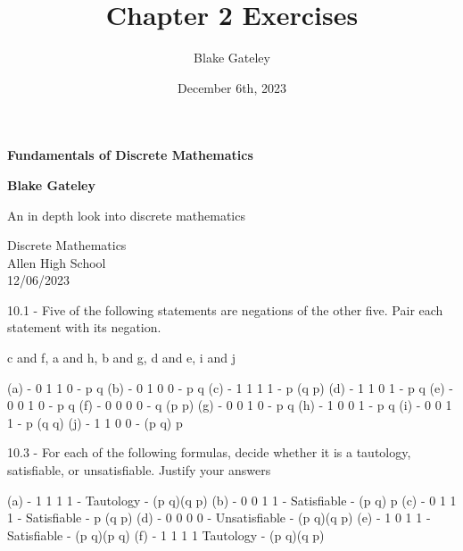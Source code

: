 \documentclass[12pt]{article}
\title{Chapter 2 Exercises}
\author{Blake Gateley}
\date{December 6th, 2023}
\begin{document}
\begin{titlepage}
   \begin{center}
       \vspace*{1cm}

       {\Huge \textbf{Fundamentals of Discrete Mathematics}}

       \vspace{0.5cm}
            
       \vspace{1.5cm}

       \textbf{Blake Gateley}


       
       \vfill
            
       An in depth look into discrete mathematics
            
       \vspace{0.8cm}
     
   
            
       Discrete Mathematics\\
       Allen High School\\
       12/06/2023
            
   \end{center}
\end{titlepage}
\tableofcontents

\newpage
10.1 - Five of the following statements are negations of the other five. Pair each statement with its negation. 

c and f, a and h, b and g, d and e, i and j     

 (a) - 0 1 1 0 - p \oplus q
 (b) - 0 1 0 0 - \neg p \wedge q
 (c) - 1 1 1 1 - p \Rightarrow (q \Rightarrow p)
 (d) - 1 1 0 1 - p \Rightarrow q
 (e) - 0 0 1 0 - p \wedge \neg q
 (f) - 0 0 0 0 - q \wedge (p \wedge \neg p)
 (g) - 0 0 1 0 - p \vee \neg q
 (h) - 1 0 0 1 - p \Leftrightarrow q
 (i) - 0 0 1 1  - p \wedge (q \vee \neg q)
 (j) - 1 1 0 0 - (p \Rightarrow q) \Rightarrow p

 10.3 - For each of the following formulas, decide whether it is a tautology, satisfiable, or unsatisfiable. Justify your answers
	
 (a) - 1 1 1 1 - Tautology - (p \vee q)\vee(q \Rightarrow p)
 (b) - 0 0 1 1 - Satisfiable - (p \Rightarrow q) \Rightarrow p
 (c) - 0 1 1 1 - Satisfiable - p \Rightarrow (q \Rightarrow p)
 (d) - 0 0 0 0 - Unsatisfiable - (\neg p \wedge q)\wedge(q \Rightarrow p)
 (e) - 1 0 1 1 - Satisfiable - (p \Rightarrow q)\Rightarrow(\neg p \Rightarrow \neg q)
 (f) - 1 1 1 1     Tautology - (\neg p \Rightarrow \neg q)\Leftrightarrow(q \Rightarrow p)
\end{document}
